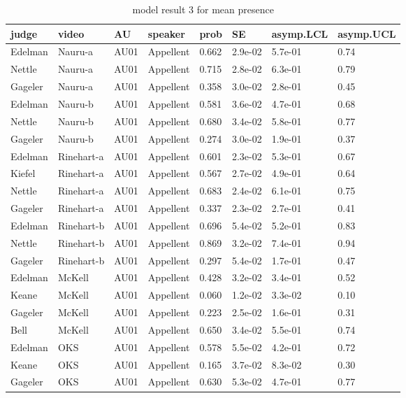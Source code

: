 \documentclass{monashthesis}
\begin{document}
\begin{center}
\begin{longtable}{llllllll}
\caption{model result 3 for mean presence}\\
\toprule
judge & video & AU & speaker & prob & SE & asymp.LCL & asymp.UCL \\
\midrule
\endhead
\bottomrule
\endfoot
Edelman & Nauru-a & AU01 & Appellent & 0.662 & 2.9e-02 & 5.7e-01 & 0.74 \\
Nettle & Nauru-a & AU01 & Appellent & 0.715 & 2.8e-02 & 6.3e-01 & 0.79 \\
Gageler & Nauru-a & AU01 & Appellent & 0.358 & 3.0e-02 & 2.8e-01 & 0.45 \\
Edelman & Nauru-b & AU01 & Appellent & 0.581 & 3.6e-02 & 4.7e-01 & 0.68 \\
Nettle & Nauru-b & AU01 & Appellent & 0.680 & 3.4e-02 & 5.8e-01 & 0.77 \\
Gageler & Nauru-b & AU01 & Appellent & 0.274 & 3.0e-02 & 1.9e-01 & 0.37 \\
Edelman & Rinehart-a & AU01 & Appellent & 0.601 & 2.3e-02 & 5.3e-01 & 0.67 \\
Kiefel & Rinehart-a & AU01 & Appellent & 0.567 & 2.7e-02 & 4.9e-01 & 0.64 \\
Nettle & Rinehart-a & AU01 & Appellent & 0.683 & 2.4e-02 & 6.1e-01 & 0.75 \\
Gageler & Rinehart-a & AU01 & Appellent & 0.337 & 2.3e-02 & 2.7e-01 & 0.41 \\
Edelman & Rinehart-b & AU01 & Appellent & 0.696 & 5.4e-02 & 5.2e-01 & 0.83 \\
Nettle & Rinehart-b & AU01 & Appellent & 0.869 & 3.2e-02 & 7.4e-01 & 0.94 \\
Gageler & Rinehart-b & AU01 & Appellent & 0.297 & 5.4e-02 & 1.7e-01 & 0.47 \\
Edelman & McKell & AU01 & Appellent & 0.428 & 3.2e-02 & 3.4e-01 & 0.52 \\
Keane & McKell & AU01 & Appellent & 0.060 & 1.2e-02 & 3.3e-02 & 0.10 \\
Gageler & McKell & AU01 & Appellent & 0.223 & 2.5e-02 & 1.6e-01 & 0.31 \\
Bell & McKell & AU01 & Appellent & 0.650 & 3.4e-02 & 5.5e-01 & 0.74 \\
Edelman & OKS & AU01 & Appellent & 0.578 & 5.5e-02 & 4.2e-01 & 0.72 \\
Keane & OKS & AU01 & Appellent & 0.165 & 3.7e-02 & 8.3e-02 & 0.30 \\
Gageler & OKS & AU01 & Appellent & 0.630 & 5.3e-02 & 4.7e-01 & 0.77 \\

\end{longtable}
\end{center}
\end{document}
